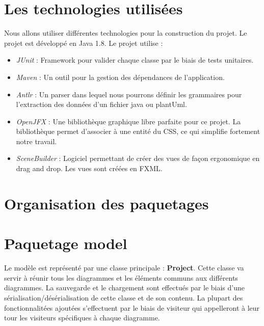 \documentclass[a4paper,10pt]{article}
\begin{document}
\section{Les technologies utilisées}
Nous allons utiliser différentes technologies pour la construction du projet.
\newline
Le projet est développé en Java 1.8.
Le projet utilise :
\begin{itemize}
 \item \emph{JUnit} : Framework pour valider chaque classe par le biais de tests unitaires.
 \item \emph{Maven} : Un outil pour la gestion des dépendances de l'application.
 \item \emph{Antlr} : Un parser dans lequel nous pourrons définir les grammaires pour l'extraction des données d'un fichier java ou plantUml.
 \item \emph{OpenJFX} : Une bibliothèque graphique libre parfaite pour ce projet. La bibliothèque permet d'associer à une entité du CSS, ce qui simplifie fortement notre travail.
 \item \emph{SceneBuilder} : Logiciel permettant de créer des vues de façon ergonomique en drag and drop. Les vues sont créées en FXML.  
\end{itemize}

\section{Organisation des paquetages}


  \section{Paquetage model}
    Le modèle est représenté par une classe principale : \textbf{Project}. 
    Cette classe va servir à réunir tous les diagrammes et les éléments communs 
    aux différents diagrammes.
    La sauvegarde et le chargement sont effectués par le biais d'une sérialisation/désérialisation 
    de cette classe et de son contenu.
    La plupart des fonctionnalitées ajoutées s'effectuent par le biais de visiteur qui appelleront 
    à leur tour les visiteurs spécifiques à chaque diagramme.
    
\end{document}
